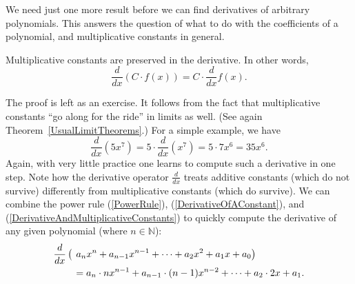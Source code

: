 We need just one more result before we can find derivatives
of arbitrary polynomials.  This answers the 
question of what to do with the coefficients of a polynomial,
and multiplicative constants in general.
%
\begin{theorem} Multiplicative constants are preserved
in the derivative.  In other words,
\begin{equation}
\frac{d}{dx}\left(C\cdot f(x)\right)=C\cdot\frac{d}{dx}f(x).
\label{DerivativeAndMultiplicativeConstants}\end{equation}
\label{TheoremOnDerivativeAndMultiplicativeConstants}\end{theorem}
The proof is left as an exercise.  It follows from the fact
that multiplicative constants ``go along for the ride''
in limits as well.  
(See again Theorem~\ref{UsualLimitTheorems}.)
For a simple example, we have
$$\frac{d}{dx}\left(5x^7\right)=5\cdot\frac{d}{dx}\left(x^7\right)
=5\cdot7x^6=35x^6.$$
Again, with very little practice one learns to compute
such a derivative in one step.
Note how the derivative operator
$\frac{d}{dx}$ treats additive constants (which do not survive)
differently from multiplicative constants (which do survive).
We can combine the power rule (\ref{PowerRule}),
(\ref{DerivativeOfAConstant}), and (\ref{DerivativeAndMultiplicativeConstants})
to quickly compute the derivative of any given polynomial
(where $n\in\mathbb{N}$):
%
\begin{equation}\begin{aligned}
\frac{d}{dx}\left(\vphantom{1_2x^2}\right.&\left.
a_nx^n+a_{n-1}x^{n-1}+\cdots+a_2x^2+a_1x+a_0\right)\\
&=a_n\cdot nx^{n-1}+a_{n-1}\cdot (n-1)x^{n-2}+\cdots+a_2\cdot2x+a_1.
\label{DerivativeOfAPolynomial}\end{aligned}\end{equation}



